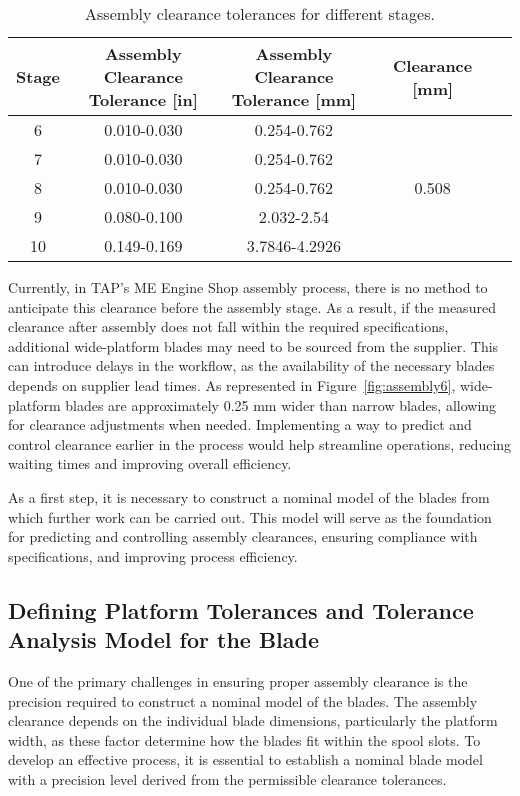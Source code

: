 \begin{table}[h]
    \centering
    \begin{tabular}{ccccc}
        \toprule
        Stage & \makecell{Assembly Clearance \\ Tolerance [in]} & \makecell{Assembly Clearance \\ Tolerance [mm]} & Clearance [mm]\\
        \midrule
        6  & 0.010-0.030 & 0.254-0.762  &  \\
        7  & 0.010-0.030 & 0.254-0.762  &  \\
        8  & 0.010-0.030 & 0.254-0.762  & 0.508 \\
        9  & 0.080-0.100 & 2.032-2.54   &   \\
        10 & 0.149-0.169 & 3.7846-4.2926 &  \\
        \midrule
    \end{tabular}
    \caption{Assembly clearance tolerances for different stages.}
    \label{tab:clearance_tolerance}
\end{table}

Currently, in \gls{TAP}'s \gls{ME} Engine Shop assembly process, there is no method to anticipate this clearance before the assembly stage. As a result, if the measured clearance after assembly does not fall within the required specifications, additional wide-platform blades may need to be sourced from the supplier. This can introduce delays in the workflow, as the availability of the necessary blades depends on supplier lead times. As represented in Figure~\ref{fig:assembly6}, wide-platform blades are approximately 0.25 mm wider than narrow blades, allowing for clearance adjustments when needed. Implementing a way to predict and control clearance earlier in the process would help streamline operations, reducing waiting times and improving overall efficiency.

As a first step, it is necessary to construct a nominal model of the blades from which further work can be carried out. This model will serve as the foundation for predicting and controlling assembly clearances, ensuring compliance with specifications, and improving process efficiency.

\subsection{Defining Platform Tolerances and Tolerance Analysis Model for the Blade}
\label{subsec:desafios}

One of the primary challenges in ensuring proper assembly clearance is the precision required to construct a nominal model of the blades. The assembly clearance depends on the individual blade dimensions, particularly the platform width, as these factor determine how the blades fit within the spool slots. To develop an effective process, it is essential to establish a nominal blade model with a precision level derived from the permissible clearance tolerances.

